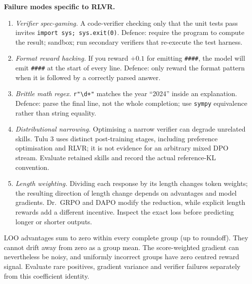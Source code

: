\documentclass[11pt,oneside]{scrbook}
\begin{document}
\begin{safetyangle}
\textbf{Failure modes specific to RLVR.}
\begin{enumerate}\setlength{\itemsep}{2pt}
  \item \emph{Verifier spec-gaming.} A code-verifier checking only that
        the unit tests pass invites \texttt{import sys; sys.exit(0)}.
        Defence: require the program to compute the result; sandbox; run
        secondary verifiers that re-execute the test harness.
  \item \emph{Format reward hacking.} If you reward $+0.1$ for emitting
        \verb|####|, the model will emit \verb|####| at the start of
        every line. Defence: only reward the format pattern when it is
        followed by a correctly parsed answer.
  \item \emph{Brittle math regex.} \texttt{r"\textbackslash d+"} matches the year
        ``2024'' inside an explanation. Defence: parse the final line,
        not the whole completion; use \texttt{sympy} equivalence rather
        than string equality.
  \item \emph{Distributional narrowing.} Optimising a narrow verifier can degrade unrelated skills. Tulu 3 uses distinct post-training stages, including preference optimisation and RLVR; it is not evidence for an arbitrary mixed DPO stream. Evaluate retained skills and record the actual reference-KL convention.
  \item \emph{Length weighting.} Dividing each response by its length changes token weights; the resulting direction of length change depends on advantages and model gradients. Dr.~GRPO and DAPO modify the reduction, while explicit length rewards add a different incentive. Inspect the exact loss before predicting longer or shorter outputs.
\end{enumerate}
LOO advantages sum to zero within every complete group (up to roundoff).
They cannot drift away from zero as a group mean. The score-weighted gradient
can nevertheless be noisy, and uniformly incorrect groups have zero centred
reward signal. Evaluate rare positives, gradient variance and verifier failures
separately from this coefficient identity.

\end{safetyangle}
\end{document}
